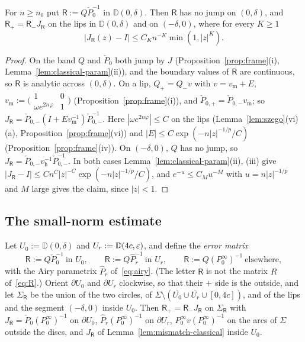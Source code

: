 \begin{lemma}\label{lem:mismatch-classical}
For $n\ge n_0$ put $\mathsf R:=Q\check P_0^{-1}$ in $\mathbb D(0,\delta)$. Then $\mathsf R$ has no jump on $(0,\delta)$, and
$\mathsf R_+=\mathsf R_-J_{\mathsf R}$ on the lips in $\mathbb D(0,\delta)$ and on $(-\delta,0)$, where for every $K\ge1$
\[
  |J_{\mathsf R}(z)-I|\le C_Kn^{-K}\min(1,|z|^K).
\]
\end{lemma}

\begin{proof}
On the band $Q$ and $\check P_0$ both jump by $J$ (Proposition~\ref{prop:frame}(i), Lemma~\ref{lem:classical-param}(ii)),
and the boundary values of $\mathsf R$ are continuous, so $\mathsf R$ is analytic across $(0,\delta)$. On a lip,
$Q_+=Q_-v$ with $v=v_{\mathrm m}+E$, $v_{\mathrm m}:=\bigl(\begin{smallmatrix}1&0\\\omega e^{2n\varphi}&1\end{smallmatrix}\bigr)$
(Proposition~\ref{prop:frame}(i)), and $\check P_{0,+}=\check P_{0,-}v_{\mathrm m}$; so
$J_{\mathsf R}=\check P_{0,-}(I+Ev_{\mathrm m}^{-1})\check P_{0,-}^{-1}$. Here $|\omega e^{2n\varphi}|\le C$ on the lips
(Lemma~\ref{lem:szego}(vi)(a), Proposition~\ref{prop:frame}(vi)) and $|E|\le C\exp(-n|z|^{-1/p}/C)$ (Proposition~\ref{prop:frame}(iv)). On
$(-\delta,0)$, $Q$ has no jump, so $J_{\mathsf R}=\check P_{0,-}v_{\mathrm h}^{-1}\check P_{0,-}^{-1}$. In both cases
Lemma~\ref{lem:classical-param}(ii), (iii) give $|J_{\mathsf R}-I|\le Cn^C|z|^{-C}\exp(-n|z|^{-1/p}/C)$, and
$e^{-u}\le C_Mu^{-M}$ with $u=n|z|^{-1/p}$ and $M$ large gives the claim, since $|z|<1$.
\end{proof}

\subsection{The small-norm estimate}\label{sec:classical-small}

Let $U_0:=\mathbb D(0,\delta)$ and $U_r:=\mathbb D(4c,\varepsilon)$, and define the \emph{error matrix}
\begin{equation}\label{eq:error-matrix}
  \mathsf R:=Q\check P_0^{-1}\ \text{in }U_0,\qquad \mathsf R:=Q\hat P_r^{-1}\ \text{in }U_r,\qquad
  \mathsf R:=Q(P^\infty_0)^{-1}\ \text{elsewhere},
\end{equation}
with the Airy parametrix $\hat P_r$ of~\eqref{eq:airy}. (The letter $\mathsf R$ is not the matrix $R$ of~\eqref{eq:R}.)
Orient $\partial U_0$ and $\partial U_r$ clockwise, so that their $+$ side is the outside, and let $\Sigma_{\mathsf R}$ be the
union of the two circles, of $\Sigma\setminus(\overline{U_0}\cup\overline{U_r}\cup[0,4c])$, and of the lips and the segment
$(-\delta,0)$ inside $U_0$. Then $\mathsf R_+=\mathsf R_-J_{\mathsf R}$ on $\Sigma_{\mathsf R}$ with
$J_{\mathsf R}=\check P_0(P^\infty_0)^{-1}$ on $\partial U_0$, $\hat P_r(P^\infty_0)^{-1}$ on $\partial U_r$,
$P^\infty_0v(P^\infty_0)^{-1}$ on the arcs of $\Sigma$ outside the discs, and $J_{\mathsf R}$ of
Lemma~\ref{lem:mismatch-classical} inside $U_0$.

